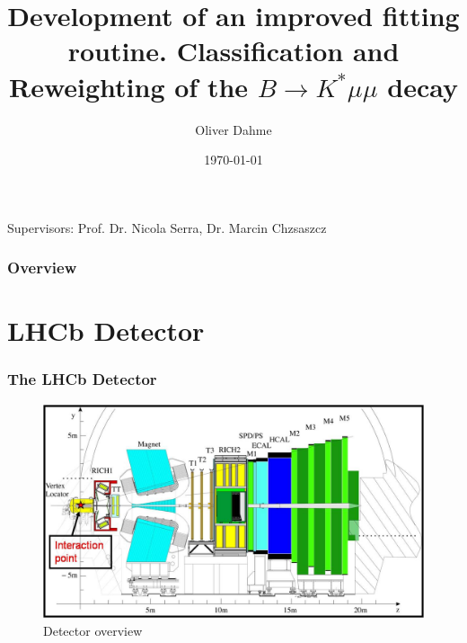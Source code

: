 \documentclass{beamer}
\title[Master Thesis]{Development of an improved fitting routine. Classification and Reweighting of the $B \rightarrow K^* \mu \mu$ decay} %
\author{Oliver Dahme} %
\institute[UZH] %
{
University of Zurich \\ %
\medskip
\textit{o.dahme@cern.ch} %
}
\date{\today} %
\begin{document}
\begin{frame}
 \titlepage %
 \centering Supervisors: Prof. Dr. Nicola Serra, Dr. Marcin Chzsaszcz
\end{frame}

\begin{frame}
 \frametitle{Overview} %
 \tableofcontents %
\end{frame}



\section{LHCb Detector}

\begin{frame}
  \frametitle{The LHCb Detector}

  \begin{figure}
    \includegraphics[width=1.0\linewidth]{figures/lhcb_detector}
    \caption{Detector overview}
  \end{figure}

\end{frame}
\end{document}
